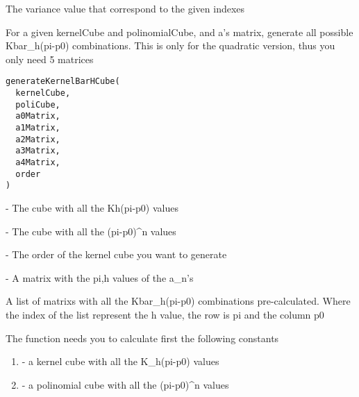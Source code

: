 \documentclass[letterpaper]{book}
\begin{document}
%
\begin{Value}
The variance value that correspond to the given indexes
\end{Value}
%
\begin{Description}\relax
For a given kernelCube and polinomialCube, and a's matrix, generate all possible Kbar\_h(pi-p0) combinations.
This is only for the quadratic version, thus you only need 5 matrices
\end{Description}
%
\begin{Usage}
\begin{verbatim}
generateKernelBarHCube(
  kernelCube,
  poliCube,
  a0Matrix,
  a1Matrix,
  a2Matrix,
  a3Matrix,
  a4Matrix,
  order
)
\end{verbatim}
\end{Usage}
%
\begin{Arguments}
\begin{ldescription}
\item[\code{kernelCube}] - The cube with all the Kh(pi-p0) values

\item[\code{poliCube}] - The cube with all the (pi-p0)\textasciicircum{}n values

\item[\code{order}] - The order of the kernel cube you want to generate

\item[\code{anMatrix}] - A matrix with the pi,h values of the a\_n's
\end{ldescription}
\end{Arguments}
%
\begin{Value}
A list of matrixs with all the Kbar\_h(pi-p0) combinations pre-calculated.
Where the index of the list represent the h value, the row is pi and the column p0
\end{Value}
%
\begin{Note}\relax
The function needs you to calculate first the following constants

\begin{enumerate}

\item{} - a kernel cube with all the K\_h(pi-p0) values
\item{} - a polinomial cube with all the (pi-p0)\textasciicircum{}n values

\end{enumerate}

\end{Note}
\end{document}
